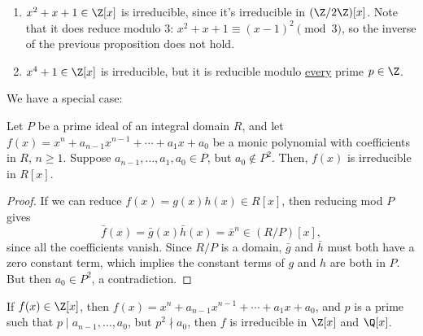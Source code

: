 \begin{ex}
    \begin{enumerate}
        \item $x^2+x+1 \in \Z[x]$ is irreducible, since it's irreducible in  $(\Z/2\Z)[x]$. Note that it does reduce modulo $3$: $x^2+x+1 \equiv (x-1)^2 \pmod 3$, so the inverse of the previous proposition does not hold.
        \item $x^4+1 \in \Z[x]$ is irreducible, but it is reducible modulo \underline{every} prime $p \in \Z$.
    \end{enumerate}
\end{ex}

We have a special case:
\begin{thm}
    Let $P$ be a prime ideal of an integral domain $R$, and let $f(x) = x^n+a_{n-1}x^{n-1}+\cdots +a_1x+a_0$ be a monic polynomial with coefficients in $R$, $n \geq 1$. Suppose $a_{n-1},\dots,a_1,a_0 \in P$, but $a_0 \not \in P^2$. Then, $f(x)$ is irreducible in $R[x]$.
\end{thm}

\begin{proof}
    If we can reduce $f(x) = g(x)h(x) \in R[x]$, then reducing mod $P$ gives
    $$\bar f(x) = \bar g(x) \bar h(x) = \bar x^n \in (R/P)[x],$$
    since all the coefficients vanish. Since $R/P$ is a domain, $\bar g$ and $\bar h$ must both have a zero constant term, which implies the constant terms of $g$ and $h$ are both in $P$. But then $a_0 \in P^2$, a contradiction.
\end{proof}

\begin{cor}
    If $f(x) \in \Z[x]$, then $f(x) = x^n + a_{n-1}x^{n-1}+\cdots +a_1x + a_0$, and $p$ is a prime such that $p \mid a_{n-1},\dots,a_0$, but $p^2 \nmid a_0$, then $f$ is irreducible in $\Z[x]$ and $\Q[x]$.
\end{cor}

